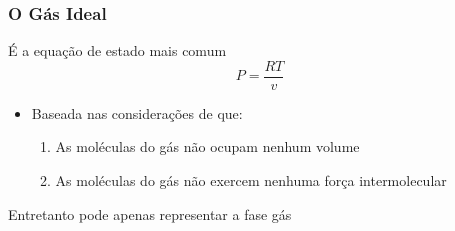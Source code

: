 \documentclass[aspectratio=169]{beamer}
\begin{document}
\begin{frame}
	\frametitle{O Gás Ideal}
	É a equação de estado mais comum
	\begin{equation*}
	P=\frac{RT}{v}
	\end{equation*}
	\begin{itemize}
	  \item Baseada nas considerações de que:
	  \begin{enumerate}
	    \item As moléculas do gás não ocupam nenhum volume
	    \item As moléculas do gás não exercem nenhuma força
		intermolecular
	  \end{enumerate}
	\end{itemize}
	Entretanto pode apenas representar a fase gás
\end{frame}
\end{document}
